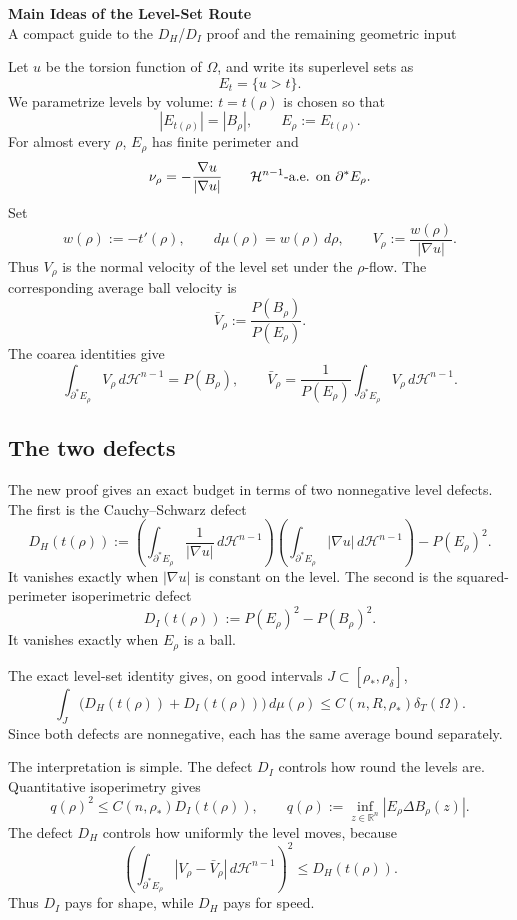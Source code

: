 \documentclass[10pt]{article}
\newcommand{\Om}{\Omega}
\newcommand{\R}{\mathbb R}
\newcommand{\Hh}{\mathcal H}
\newcommand{\dT}{\delta_T}
\newcommand{\Per}{P}
\begin{document}
\begin{center}
{\large\bf Main Ideas of the Level-Set Route}\\
{\small A compact guide to the $D_H$/$D_I$ proof and the remaining geometric input}
\end{center}

Let $u$ be the torsion function of $\Om$, and write its superlevel sets as
\[
   E_t=\{u>t\}.
\]
We parametrize levels by volume: $t=t(\rho)$ is chosen so that
\[
   |E_{t(\rho)}|=|B_\rho|, \qquad E_\rho:=E_{t(\rho)}.
\]
For almost every $\rho$, $E_\rho$ has finite perimeter and
\[
   \nu_\rho=-\frac{\nabla u}{|\nabla u|}
   \qquad \Hh^{n-1}\hbox{-a.e. on }\partial^*E_\rho .
\]
Set
\[
   w(\rho):=-t'(\rho),\qquad d\mu(\rho)=w(\rho)\,d\rho,
   \qquad V_\rho:=\frac{w(\rho)}{|\nabla u|}.
\]
Thus $V_\rho$ is the normal velocity of the level set under the $\rho$-flow. The corresponding average ball velocity is
\[
   \bar V_\rho:=\frac{\Per(B_\rho)}{\Per(E_\rho)}.
\]
The coarea identities give
\[
   \int_{\partial^*E_\rho} V_\rho\,d\Hh^{n-1}=\Per(B_\rho),
   \qquad
   \bar V_\rho=\frac1{\Per(E_\rho)}
      \int_{\partial^*E_\rho}V_\rho\,d\Hh^{n-1}.
\]

\subsection*{The two defects}

The new proof gives an exact budget in terms of two nonnegative level defects. The first is the Cauchy--Schwarz defect
\[
D_H(t(\rho))
:=\left(\int_{\partial^*E_\rho}\frac1{|\nabla u|}\,d\Hh^{n-1}\right)
  \left(\int_{\partial^*E_\rho}|\nabla u|\,d\Hh^{n-1}\right)
   -\Per(E_\rho)^2.
\]
It vanishes exactly when $|\nabla u|$ is constant on the level. The second is the squared-perimeter isoperimetric defect
\[
   D_I(t(\rho)):=\Per(E_\rho)^2-\Per(B_\rho)^2.
\]
It vanishes exactly when $E_\rho$ is a ball.

The exact level-set identity gives, on good intervals $J\subset[\rho_*,\rho_\delta]$,
\[
   \int_J \bigl(D_H(t(\rho))+D_I(t(\rho))\bigr)\,d\mu(\rho)
   \le C(n,R,\rho_*)\dT(\Om).
\]
Since both defects are nonnegative, each has the same average bound separately.

The interpretation is simple. The defect $D_I$ controls how round the levels are. Quantitative isoperimetry gives
\[
   q(\rho)^2\le C(n,\rho_*)D_I(t(\rho)),
   \qquad
   q(\rho):=\inf_{z\in\R^n}|E_\rho\Delta B_\rho(z)|.
\]
The defect $D_H$ controls how uniformly the level moves, because
\[
   \left(\int_{\partial^*E_\rho}|V_\rho-\bar V_\rho|\,d\Hh^{n-1}\right)^2
   \le D_H(t(\rho)).
\]
Thus $D_I$ pays for shape, while $D_H$ pays for speed.
\end{document}
